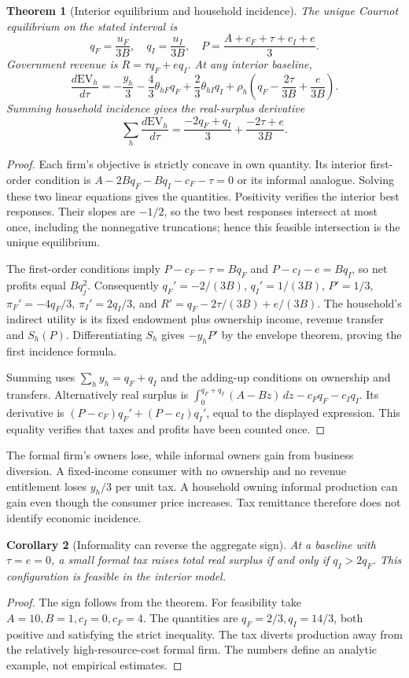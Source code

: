 \documentclass[11pt]{article}
\newtheorem{theorem}{Theorem}
\newtheorem{corollary}[theorem]{Corollary}
\theoremstyle{remark}\newtheorem{remark}[theorem]{Remark}
\begin{document}
\begin{theorem}[Interior equilibrium and household incidence]
The unique Cournot equilibrium on the stated interval is
\[
 q_F=\frac{u_F}{3B},\quad q_I=\frac{u_I}{3B},\quad
 P=\frac{A+c_F+\tau+c_I+e}{3}.
\]
Government revenue is $R=\tau q_F+e q_I$. At any interior baseline,
\[
 \frac{d\mathrm{EV}_h}{d\tau}
 =-\frac{y_h}{3}-\frac43\theta_{hF}q_F
 +\frac23\theta_{hI}q_I
 +\rho_h\left(q_F-\frac{2\tau}{3B}+\frac e{3B}\right).
\]
Summing household incidence gives the real-surplus derivative
\[
 \sum_h\frac{d\mathrm{EV}_h}{d\tau}
 =\frac{-2q_F+q_I}{3}+\frac{-2\tau+e}{3B}.
\]
\end{theorem}
\begin{proof}
Each firm's objective is strictly concave in own quantity. Its interior first-order condition is $A-2Bq_F-Bq_I-c_F-\tau=0$ or its informal analogue. Solving these two linear equations gives the quantities. Positivity verifies the interior best responses. Their slopes are $-1/2$, so the two best responses intersect at most once, including the nonnegative truncations; hence this feasible intersection is the unique equilibrium.

The first-order conditions imply $P-c_F-\tau=Bq_F$ and $P-c_I-e=Bq_I$, so net profits equal $Bq_j^2$. Consequently $q_F'=-2/(3B)$, $q_I'=1/(3B)$, $P'=1/3$, $\pi_F'=-4q_F/3$, $\pi_I'=2q_I/3$, and $R'=q_F-2\tau/(3B)+e/(3B)$. The household's indirect utility is its fixed endowment plus ownership income, revenue transfer and $S_h(P)$. Differentiating $S_h$ gives $-y_hP'$ by the envelope theorem, proving the first incidence formula.

Summing uses $\sum_hy_h=q_F+q_I$ and the adding-up conditions on ownership and transfers. Alternatively real surplus is
$\int_0^{q_F+q_I}(A-Bz)\,dz-c_Fq_F-c_Iq_I$.
Its derivative is $(P-c_F)q_F'+(P-c_I)q_I'$, equal to the displayed expression. This equality verifies that taxes and profits have been counted once.
\end{proof}

The formal firm's owners lose, while informal owners gain from business diversion. A fixed-income consumer with no ownership and no revenue entitlement loses $y_h/3$ per unit tax. A household owning informal production can gain even though the consumer price increases. Tax remittance therefore does not identify economic incidence.

\begin{corollary}[Informality can reverse the aggregate sign]
At a baseline with $\tau=e=0$, a small formal tax raises total real surplus if and only if $q_I>2q_F$. This configuration is feasible in the interior model.
\end{corollary}
\begin{proof}
The sign follows from the theorem. For feasibility take $A=10,B=1,c_I=0,c_F=4$. The quantities are $q_F=2/3,q_I=14/3$, both positive and satisfying the strict inequality. The tax diverts production away from the relatively high-resource-cost formal firm. The numbers define an analytic example, not empirical estimates.
\end{proof}
\end{document}
